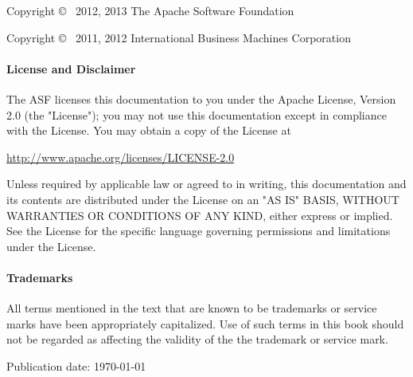 
%
%
Copyright \copyright~ 2012, 2013 The Apache Software Foundation

Copyright \copyright~ 2011, 2012 International Business Machines Corporation

{\addtolength{\leftskip}{10 mm}
     \paragraph{License and Disclaimer}
     The ASF licenses this documentation to you under the Apache License, Version 2.0 (the "License");
     you may not use this documentation except in compliance with the License.  You may obtain a copy of
     the License at
              
     \url{http://www.apache.org/licenses/LICENSE-2.0}
     
     Unless required by applicable law or agreed to in writing, this documentation and its contents are
     distributed under the License on an "AS IS" BASIS, WITHOUT WARRANTIES OR CONDITIONS OF ANY KIND,
     either express or implied.  See the License for the specific language governing permissions and
     limitations under the License.

     \paragraph{Trademarks}     
     All terms mentioned in the text that are known to be trademarks or service marks have been
     appropriately capitalized.  Use of such terms in this book should not be regarded as affecting the
     validity of the the trademark or service mark.

}

\vspace{.5in}

Publication date: \mydate\today

